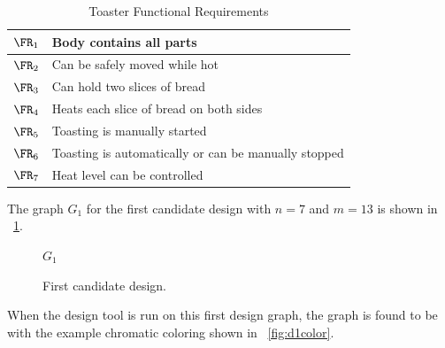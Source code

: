 \begin{table}[H]
  \centering
  \caption{Toaster Functional Requirements}
  \label{toasterfrs}
  \begin{tabular}{|c|l|}
    \hline
    \(\FR_1\) & Body contains all parts \\
    \hline
    \(\FR_2\) & Can be safely moved while hot \\
    \hline
    \(\FR_3\) & Can hold two slices of bread \\
    \hline
    \(\FR_4\) & Heats each slice of bread on both sides \\
    \hline
    \(\FR_5\) & Toasting is manually started \\
    \hline
    \(\FR_6\) & Toasting is automatically or can be manually stopped \\
    \hline
    \(\FR_7\) & Heat level can be controlled \\
    \hline
  \end{tabular}
\end{table}

The graph \(G_1\) for the first candidate design with \(n=7\) and \(m=13\) is shown in
\figurename~\ref{fig:design1}.

\begin{figure}[H]
  \centering

  \(G_1\)
  \caption{First candidate design.}
  \label{fig:design1}
\end{figure}

When the design tool is run on this first design graph, the graph is found to be  with the example
chromatic coloring shown in \figurename~\ref{fig:d1color}.

